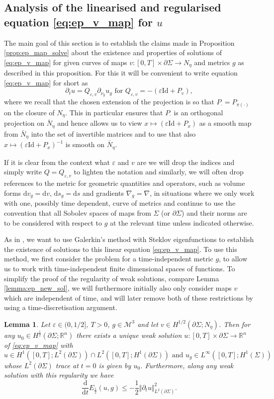 \documentclass[10pt,reqno]{amsart}
\theoremstyle{plain}
\newtheorem{lemma}{Lemma}[section]
\theoremstyle{definition}
\numberwithin{equation}{section}
\newcommand{\Si}{\Sigma}
\newcommand{\ep}{\varepsilon}
\newcommand{\R}{\ensuremath{{\mathbb R}}}
\newcommand{\norm}[1]{\Vert#1\Vert}
\newcommand{\beq}{\begin{equation}}
\newcommand{\eeq}{\end{equation}}
\newcommand{\beqs}{\begin{equation*}}
\newcommand{\eeqs}{\end{equation*}}
\newcommand{\half}{\frac{1}{2}}
\newcommand{\dd}{\mathrm{d}} %
\newcommand{\Id}{\text{Id}}
\newcommand{\eps}{\varepsilon}
\newcommand{\pSi}{{\partial \Sigma}}
\newcommand{\MM}{\mathcal{M}} %
\newcommand{\hf}{\frac{1}{2}} %
\newcommand{\p}{\partial} %
\begin{document}
\subsection{Analysis of the linearised and regularised equation \eqref{eq:ep_v_map} for $u$} \label{subsec:map-lin-reg}
The main goal of this section is to establish the claims made in Proposition \ref{prop:ep_map_solve} about the existence and properties of solutions of \eqref{eq:ep_v_map} for given curves of maps $v:[0,T]\times \pSi\to N_\eta$ and metrics $g$ as described in this proposition. For this it will be convenient to write equation \eqref{eq:ep_v_map} for short as 
\beqs
    \p_t u = Q_{\ep,v} \p_{\nu_{g}}u_{g} \text{ for }  Q_{\ep,v} = -(\ep \Id+ P_{v}),
\eeqs
where we recall that the chosen extension of the projection is so that $P_\cdot=P_{\pi(\cdot)}$ on the closure of $N_\eta$. This in particular ensures that $P_\cdot$ is an orthogonal projection on $\bar N_\eta$ and hence allows us to view $x\mapsto (\eps \Id+P_x)$ as a smooth map from $\bar N_\eta$ into the set of invertible matrices and to use that also $x\mapsto (\eps \Id+P_x)^{-1}$ is smooth on $\bar N_\eta. $   

If it is clear from the context what $\eps$ and $v$ are we will  drop the indices and simply write  $Q=Q_{\ep,v}$ to lighten the notation and similarly, we will often drop references to the metric for geometric quantities and operators, such as volume forms $\dd v_g = \dd v$, $\dd s_g = \dd s$ and gradients $\nabla_g = \nabla$, in situations where we only work with one, possibly time dependent, curve of metrics and continue to use the convention that all Sobolev spaces of maps from $\Si$ (or $\pSi$) and their norms are to be considered with respect to $g$ at the relevant time unless indicated otherwise. 

As in \cite{S}, we want to use Galerkin's method with Steklov eigenfunctions to establish the existence of solutions to this linear equation \eqref{eq:ep_v_map}. To use this method, we first consider the problem for a time-independent metric $g$, to allow us to work with time-independent finite dimensional spaces of functions. To simplify the proof of the regularity of weak solutions, compare Lemma \ref{lemma:ep_new_sol}, we will furthermore initially also only consider maps $v$ which are independent of time, and will later remove both of these restrictions by using a time-discretisation argument. 

\begin{lemma}\label{lemma:ep_time_ind_weak_exist}
    Let $\ep\in (0, 1/2]$, $T>0$,  $g\in\MM^{3}$ and let $v\in H^{1/2}(\pSi;N_\eta)$. Then for any $u_0 \in  H^{\hf}(\p\Si;\R^n)$ there exists a unique weak solution $u:[0,T]\times \pSi\to \R^n$ of \eqref{eq:ep_v_map} with 
    $$u\in H^1([0,T];L^2(\p\Si))\cap L^2([0,T];H^1(\p\Si)) \text{ and } u_g\in  L^\infty([0,T];H^1(\Si)) %
    $$
    whose $L^2(\pSi)$ trace at $t=0$ is given by $u_0$. Furthermore, along any weak solution with this regularity we have  
    \beq\label{eq:energy-dec_ep_approx}
        \frac{\dd}{\dd t}E_\half(u,g)\leq -\half\norm{\p_tu}_{L^2(\p\Si)}^2.
    \eeq
\end{lemma}
\end{document}
